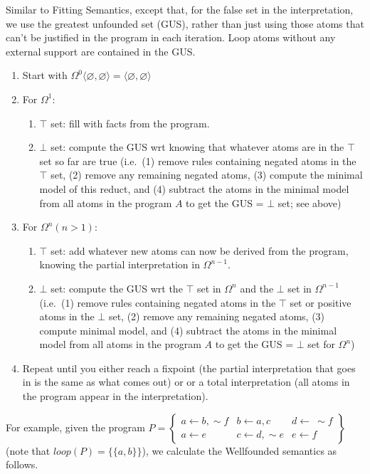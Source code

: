 \documentclass[9pt,a4paper,landscape]{article}
\begin{document}
{Similar to Fitting Semantics, except that, for the false set in the interpretation, we use the greatest unfounded set (GUS), rather than just using those atoms that can't be justified in the program in each iteration.
Loop atoms without any external support are contained in the GUS.

\begin{enumerate}[noitemsep]
	\item Start with $\Omega^0 \langle \varnothing, \varnothing \rangle = \langle \varnothing, \varnothing \rangle$
	\item For $\Omega^1$:
	\begin{enumerate}[noitemsep]
		\item $\top$ set: fill with facts from the program.
		\item $\bot$ set: compute the GUS wrt knowing that whatever atoms are in the $\top$ set so far are true (i.e.\ (1) remove rules containing negated atoms in the $\top$ set, (2) remove any remaining negated atoms, (3) compute the minimal model of this reduct, and (4) subtract the atoms in the minimal model from all atoms in the program $A$ to get the GUS = $\bot$ set; see above)
	\end{enumerate}
	\item For $\Omega^n (n>1)$:
	\begin{enumerate}[noitemsep]
		\item $\top$ set: add whatever new atoms can now be derived from the program, knowing the partial interpretation in $\Omega^{n-1}$.
		\item $\bot$ set: compute the GUS wrt the $\top$ set in $\Omega^n$ and the $\bot$ set in $\Omega^{n-1}$ (i.e.\ (1) remove rules containing negated atoms in the $\top$ set or positive atoms in the $\bot$ set, (2) remove any remaining negated atoms, (3) compute minimal model, and (4) subtract the atoms in the minimal model from all atoms in the program $A$ to get the GUS = $\bot$ set for  $\Omega^{n}$)
	\end{enumerate}	
	\item Repeat until you either reach a fixpoint (the partial interpretation that goes in is the same as what comes out) or or a total interpretation (all atoms in the program appear in the interpretation).
\end{enumerate}

\pagebreak

For example, given the program $P = \left\{\begin{array}{lll}
a \leftarrow b, \sim f & b \leftarrow a, c & d \leftarrow\ \sim f\\
a \leftarrow e & c \leftarrow d, \sim e & e \leftarrow f
\end{array}\right\}$ (note that $loop(P) = \{ \{a, b \} \}$), we calculate the Wellfounded semantics as follows.

}
\end{document}
